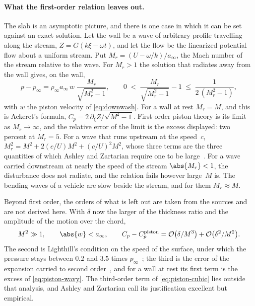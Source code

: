 \paragraph{What the first-order relation leaves out.}
The slab is an asymptotic picture, and there is one case in which it can be
set against an exact solution. Let the wall be a wave of arbitrary profile
travelling along the stream, $Z = G(k\xi - \omega t)$, and let the flow be
the linearized potential flow about a uniform stream. Put
$M_r = (U - \omega/k)/a_\infty$, the Mach number of the stream relative to
the wave. For $M_r > 1$ the solution that radiates away from the wall gives,
on the wall,
\begin{equation}\label{eq:piston-wavy}
  p - p_\infty = \rho_\infty a_\infty\,w\;\frac{M_r}{\sqrt{M_r^2-1}} ,
  \qquad
  0 \;<\; \frac{M_r}{\sqrt{M_r^2-1}} - 1 \;\le\; \frac{1}{2\,(M_r^2-1)} ,
\end{equation}
with $w$ the piston velocity of \cref{eq:downwash}. For a wall at rest
$M_r = M$, and this is Ackeret's formula,
$C_p = 2\,\partial_\xi Z/\sqrt{M^2-1}$. First-order piston theory is its
limit as $M_r\to\infty$, and the relative error of the limit is the excess
displayed: two percent at $M_r = 5$. For a wave that runs upstream at the
speed~$c$, $M_r^2 = M^2 + 2(c/U)M^2 + (c/U)^2M^2$, whose three terms are the
three quantities of which Ashley and Zartarian require one to be
large~\cite{ashley1956piston}. For a wave carried downstream at nearly the
speed of the stream $\abs{M_r} < 1$, the disturbance does not radiate, and
the relation fails however large~$M$ is. The bending waves of a vehicle are
slow beside the stream, and for them $M_r \approx M$.

Beyond first order, the orders of what is left out are taken from the
sources and are not derived here. With $\delta$ now the larger of the
thickness ratio and the amplitude of the motion over the chord,
\begin{equation}\label{eq:piston-validity}
  M^2 \gg 1, \qquad \abs{w} < a_\infty, \qquad
  C_p - C_p^{\mathrm{piston}}
  = \mathcal{O}\bigl(\delta/M^{3}\bigr) + \mathcal{O}\bigl(\delta^{2}/M^{2}\bigr) .
\end{equation}
The second is Lighthill's condition on the speed of the surface, under which
the pressure stays between $0.2$ and $3.5$ times
$p_\infty$~\cite{lighthill1953oscillating}; the third is the error of the
expansion carried to second order~\cite{ashley1956piston}, and for a wall at
rest its first term is the excess of \cref{eq:piston-wavy}. The third-order
term of \cref{eq:piston-cubic} lies outside that analysis, and Ashley and
Zartarian call its justification excellent but empirical.

